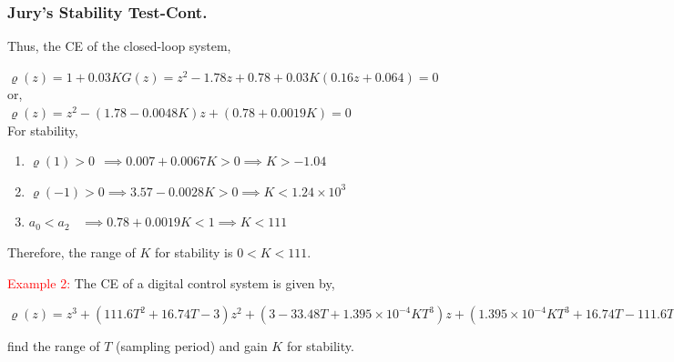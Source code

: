 \documentclass[mathserif, 10pt]{beamer} %
\begin{document}
\frame
{
\normalsize

\frametitle{Jury's Stability Test-Cont.}

Thus, the CE of the closed-loop system, \\ \vspace{.05in}

$\varrho (z) = 1+0.03KG(z) = z^2-1.78z+0.78+0.03K(0.16z+0.064)=0$ \\
or,\\

$\varrho(z) = z^2-(1.78-0.0048K)z+(0.78+0.0019K) = 0$ \\ \vspace{.05in}
For stability,  \\ \vspace{.05in}
\begin{enumerate}
	\item $\varrho(1) >0 ~~\implies 0.007+0.0067K>0 \implies K>-1.04$\\
	\item $\varrho(-1)>0 \implies 3.57 - 0.0028K>0 \implies K<1.24 \times 10^3$
	\item $a_0<a_2~~~~\implies 0.78+0.0019K<1 \implies K<111$
\end{enumerate}

Therefore, the range of $K$ for stability is   $0<K<111$.  \\ \vspace{.05in}

\textcolor{red}{Example 2:} The CE of a digital control system is given by, \\ \vspace{.05in}

$\varrho(z) = z^3+(111.6 T^2+16.74T-3) z^2+(3-33.48T+1.395 \times 10^{-4}KT^3)z+(1.395 \times 10^{-4}KT^3+16.74T-111.6T^2-1) = 0$ \\ \vspace{.05in}

find the range of $T$ (sampling period) and gain $K$ for stability.\\



}
\end{document}
